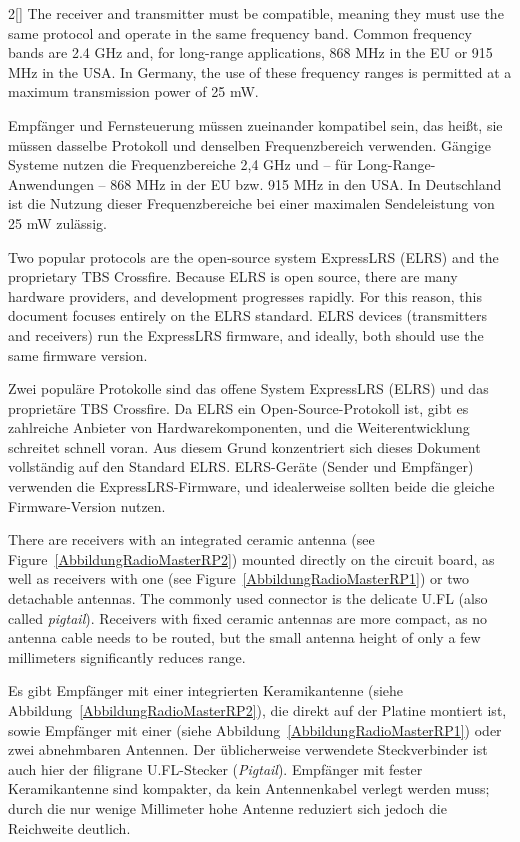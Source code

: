 \begin{paracol}{2}[]
The receiver and transmitter must be compatible, meaning they must use the same protocol and operate in the same frequency band. Common frequency bands are 2.4 GHz and, for long-range applications, 868 MHz in the EU or 915 MHz in the USA. In Germany, the use of these frequency ranges is permitted at a maximum transmission power of 25 mW.

\colger

Empfänger und Fernsteuerung müssen zueinander kompatibel sein, das heißt, sie müssen dasselbe Protokoll und denselben Frequenzbereich verwenden. Gängige Systeme nutzen die Frequenzbereiche 2,4 GHz und -- für Long-Range-Anwendungen -- 868 MHz in der EU bzw. 915 MHz in den USA. In Deutschland ist die Nutzung dieser Frequenzbereiche bei einer maximalen Sendeleistung von 25 mW zulässig.

\coleng

Two popular protocols are the open-source system ExpressLRS (ELRS) and the proprietary TBS Crossfire. Because ELRS is open source, there are many hardware providers, and development progresses rapidly. For this reason, this document focuses entirely on the ELRS standard. ELRS devices (transmitters and receivers) run the ExpressLRS firmware, and ideally, both should use the same firmware version.

\colger

Zwei populäre Protokolle sind das offene System ExpressLRS (ELRS) und das proprietäre TBS Crossfire. Da ELRS ein Open-Source-Protokoll ist, gibt es zahlreiche Anbieter von Hardwarekomponenten, und die Weiterentwicklung schreitet schnell voran. Aus diesem Grund konzentriert sich dieses Dokument vollständig auf den Standard ELRS. ELRS-Geräte (Sender und Empfänger) verwenden die ExpressLRS-Firmware, und idealerweise sollten beide die gleiche Firmware-Version nutzen.

\coleng

There are receivers with an integrated ceramic antenna (see Figure~\ref{AbbildungRadioMasterRP2}) mounted directly on the circuit board, as well as receivers with one (see Figure~\ref{AbbildungRadioMasterRP1}) or two detachable antennas. The commonly used connector is the delicate U.FL (also called \textsl{pigtail}). Receivers with fixed ceramic antennas are more compact, as no antenna cable needs to be routed, but the small antenna height of only a few millimeters significantly reduces range.

\colger

Es gibt Empfänger mit einer integrierten Keramikantenne (siehe Abbildung~\ref{AbbildungRadioMasterRP2}), die direkt auf der Platine montiert ist, sowie Empfänger mit einer (siehe Abbildung~\ref{AbbildungRadioMasterRP1}) oder zwei abnehmbaren Antennen. Der üblicherweise verwendete Steckverbinder ist auch hier der filigrane U.FL-Stecker (\textsl{Pigtail}). Empfänger mit fester Keramikantenne sind kompakter, da kein Antennenkabel verlegt werden muss; durch die nur wenige Millimeter hohe Antenne reduziert sich jedoch die Reichweite deutlich.


\end{paracol}
